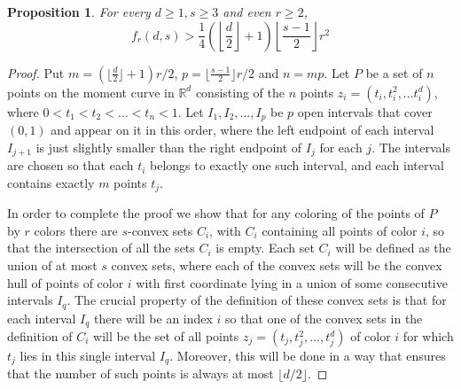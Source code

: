 \documentclass[11pt]{article}
\theoremstyle{plain}
\newtheorem{proposition}[theorem]{Proposition}
\theoremstyle{definition}
\theoremstyle{remark}
\begin{document}
\begin{proposition}
\label{t42}
For every $d \geq 1, s \geq 3$ and even $r \geq 2$,
$$
f_r(d,s) > \frac{1}{4} \left ( \left \lfloor \frac{d}{2}\right \rfloor+1\right)
\left \lfloor \frac{s-1}{2} \right \rfloor r^2
$$
\end{proposition}

\begin{proof}
Put $m=(\lfloor \frac{d}{2}\rfloor+1)r/2$,
$p=\lfloor \frac{s-1}{2} \rfloor r/2$ and $n=mp$.
Let $P$ be a set of $n$ points on the moment curve
in  $\mathbb{R}^d$ consisting of the $n$ points
$z_i=(t_i,t_i^2, \ldots t_i^d)$, where $0 <t_1<t_2 <  \ldots
<t_n<1$. Let  $I_1,I_2, \ldots ,I_p$ be $p$ open intervals that cover
$(0,1)$ and appear on it in this order, 
where the left endpoint of each interval $I_{j+1}$ is
just slightly smaller than the right endpoint of $I_j$ for each $j$.
The intervals are chosen so that each $t_i$ belongs to exactly one
such interval, and each interval contains exactly $m$ points $t_j$.

In order to complete the proof we show
that for any coloring of the points of $P$  by $r$ colors
there are $s$-convex sets $C_i$, with $C_i$ containing all points
of color $i$, so that the intersection of all the sets $C_i$ is
empty. Each set $C_i$  will be defined as the union of at most
$s$ convex sets, where each of the convex sets will be 
the convex hull of points of color $i$ with first coordinate 
lying in a union of some consecutive intervals $I_q$. The crucial
property of the definition of these convex sets is that for 
each interval $I_q$  there will be an index $i$ so that one of the
convex sets in the definition of $C_i$ will be the set of all
points $z_j=(t_j,t_j^2, \ldots ,t_j^d)$
of color $i$ for which $t_j$ lies in this single interval $I_q$.
Moreover, this will be done in a way that ensures that the number of such
points is always at most $\lfloor d/2 \rfloor$.  


\end{proof}
\end{document}
